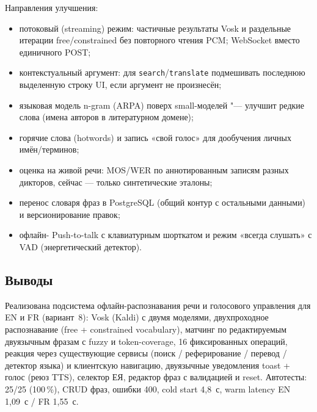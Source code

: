 Направления улучшения:

\begin{itemize}
	\item потоковый (streaming) режим: частичные результаты Vosk
	      и раздельные итерации free/constrained без повторного чтения
	      PCM; WebSocket вместо единичного POST;
	\item контекстуальный аргумент: для \texttt{search}/\texttt{translate}
	      подмешивать последнюю выделенную строку UI, если аргумент
	      не произнесён;
	\item языковая модель n-gram (ARPA) поверх small-моделей "---
	      улучшит редкие слова (имена авторов в литературном домене);
	\item горячие слова (hotwords) и запись «свой голос» для дообучения
	      личных имён/терминов;
	\item оценка на живой речи: MOS/WER по аннотированным записям
	      разных дикторов, сейчас --- только синтетические эталоны;
	\item перенос словаря фраз в PostgreSQL (общий контур с остальными
	      данными) и версионирование правок;
	\item офлайн- Push-to-talk с клавиатурным шорткатом и режим
	      «всегда слушать» с VAD (энергетический детектор).
\end{itemize}

\subsection{Выводы}

Реализована подсистема офлайн-распознавания речи и голосового
управления для EN и FR (вариант~8): Vosk (Kaldi) с двумя моделями,
двухпроходное распознавание (free + constrained vocabulary),
матчинг по редактируемым двуязычным фразам с fuzzy и token-coverage,
16 фиксированных операций, реакция через существующие сервисы
(поиск / реферирование / перевод / детектор языка) и клиентскую
навигацию, двуязычные уведомления toast + голос (реюз TTS),
селектор ЕЯ, редактор фраз с валидацией и reset. Автотесты:
25/25 (100\,\%), CRUD фраз, ошибки 400, cold start 4,8~с,
warm latency EN 1,09~с / FR 1,55~с.
